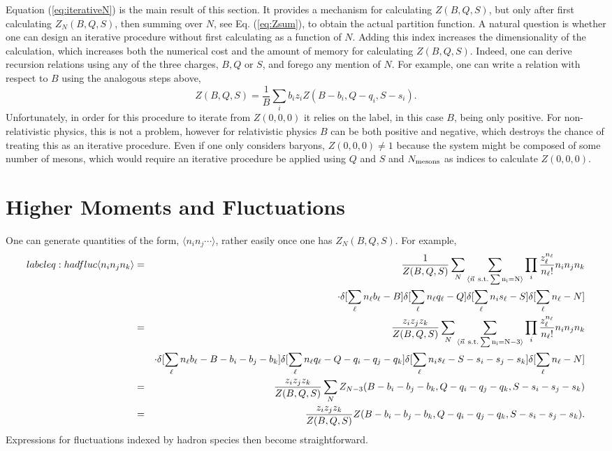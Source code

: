 \documentclass[letterpaper,aps,showpacs,floatfix,10pt,prc]{revtex4-1}
\begin{document}
Equation (\ref{eq:iterativeN}) is the main result of this section. It provides a mechanism for calculating $Z(B,Q,S)$, but only after first calculating $Z_N(B,Q,S)$, then summing over $N$, see Eq. (\ref{eq:Zsum}), to obtain the actual partition function. A natural question is whether one can design an iterative procedure without first calculating as a function of $N$. Adding this index increases the dimensionality of the calculation, which increases both the numerical cost and the amount of memory for calculating $Z(B,Q,S)$. Indeed, one can derive recursion relations using any of the three charges, $B,Q$ or $S$, and forego any mention of $N$. For example, one can write a relation with respect to $B$ using the analogous steps above,
\begin{equation}
\label{eq:iterateB}
Z(B,Q,S)=\frac{1}{B}\sum_i b_iz_i Z(B-b_i,Q-q_i,S-s_i).
\end{equation}
Unfortunately, in order for this procedure to iterate from $Z(0,0,0)$ it relies on the label, in this case $B$, being only positive. For non-relativistic physics, this is not a problem, however for relativistic physics $B$ can be both positive and negative, which destroys the chance of treating this as an iterative procedure. Even if one only considers baryons, $Z(0,0,0)\ne 1$ because the system might be composed of some number of mesons, which would require an iterative procedure be applied using $Q$ and $S$ and $N_{\rm{mesons}}$ as indices to calculate $Z(0,0,0)$.

\section{Higher Moments and Fluctuations}
One can generate quantities of the form, $\langle n_in_j\cdots\rangle$, rather easily once one has $Z_N(B,Q,S)$. For example,
\begin{eqnarray}label{eq:hadfluc}
\langle n_in_jn_k\rangle&=&
\frac{1}{Z(B,Q,S)}
\sum_N \sum_{\langle \vec{n} \rm{~s.t.}\sum n_i=N\rangle}
\prod_i\frac{z_\ell^{n_\ell}}{n_\ell!}n_in_jn_k\\
\nonumber
&&\cdot\delta[\sum_\ell n_\ell b_\ell-B]\delta[\sum_\ell n_\ell q_\ell-Q]\delta[\sum_\ell n_is_\ell-S]
\delta[\sum_\ell n_\ell-N]\\
\nonumber
&=&
\frac{z_iz_jz_k}{Z(B,Q,S)}
\sum_N \sum_{\langle \vec{n} \rm{~s.t.}\sum n_i=N-3\rangle}
\prod_i\frac{z_\ell^{n_\ell}}{n_\ell!}n_in_jn_k\\
\nonumber
&&\cdot\delta[\sum_\ell n_\ell b_\ell-B-b_i-b_j-b_k]
\delta[\sum_\ell n_\ell q_\ell-Q-q_i-q_j-q_k]
\delta[\sum_\ell n_is_\ell-S-s_i-s_j-s_k]
\delta[\sum_\ell n_\ell-N]\\
\nonumber
&=&\frac{z_iz_jz_k}{Z(B,Q,S)}
\sum_N Z_{N-3}(B-b_i-b_j-b_k,Q-q_i-q_j-q_k,S-s_i-s_j-s_k)\\
\nonumber
&=&\frac{z_iz_jz_k}{Z(B,Q,S)}
Z(B-b_i-b_j-b_k,Q-q_i-q_j-q_k,S-s_i-s_j-s_k).
\end{eqnarray}
Expressions for fluctuations indexed by hadron species then become straightforward.
\end{document}
